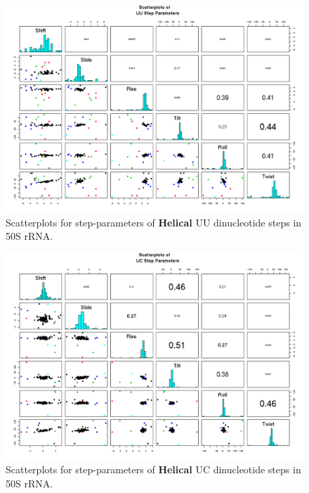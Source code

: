 \begin{figure}[H]
\centering
\includegraphics[angle=90, scale=0.6]{Helical/UU.png}
\caption{Scatterplots for step-parameters of \textbf{Helical} UU dinucleotide steps
in 50S rRNA.}
\label{fig:stepsUU}
\end{figure}

\begin{figure}[H]
\centering
\includegraphics[angle=90, scale=0.6]{Helical/UC.png}
\caption{Scatterplots for step-parameters of \textbf{Helical} UC dinucleotide steps
in 50S rRNA.}
\label{fig:stepsUC}
\end{figure}


